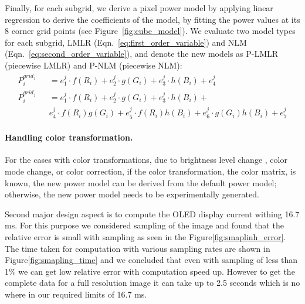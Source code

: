 Finally, for each subgrid, we derive a pixel power model by applying linear regression 
to derive the coefficients of the model, \ie by fitting the power values at its 8 corner grid points
(see Figure~\ref{fig:cube_model}).  We
evaluate two model types for each subgrid, LMLR
(Eqn.~\ref{eq:first_order_variable}) and NLM (Eqn.~\ref{eq:second_order_variable}),
and denote the new models as P-LMLR (piecewise LMLR) and P-NLM (piecewise NLM):
{\small
  \begin{eqnarray}
	P^{grid_j}_i &&= e_1^j\cdot f(R_i) + e_2^j\cdot g(G_i) + e_3^j\cdot h(B_i) + e_4^j
	\label{eq:first_order_variable} \\
  P^{grid_j}_i &&= e_1^j\cdot f(R_i) + e_2^j\cdot g(G_i) + e_3^j\cdot h(B_i) + \label{eq:second_order_variable} \\
&&  e_4^j\cdot f(R_i)g(G_i) +
  e_5^j\cdot f(R_i)h(B_i) +
  e_6^j\cdot g(G_i)h(B_i) +
  e_7^j \nonumber
\end{eqnarray}
}
\noindent

\vspace{-0.1in}
\paragraph{Handling color transformation.}
{For the cases with color transformations, \ie due to brightness level change
, color mode change, or color correction,
 if  the color transformation, \ie the color matrix, is known,
 the new power model can be derived from the default power model;
 otherwise, the new power model needs to be experimentally generated.
}

Second major design aspect is to compute the OLED display current withing
16.7 ms. For this purpose we considered sampling of the image and found that
the relative error is small with sampling as seen in the
Figure\ref{fig:smaplinh_error}. The time taken for computation with various
sampling rates are shown in Figure\ref{fig:smapling_time} and we concluded
that even with sampling of less than 1\% we can get low relative error with
computation speed up. However to get the complete data for a full resolution
image it can take up to 2.5 seconds which is no where in our required limits
of 16.7 ms.
\fi



